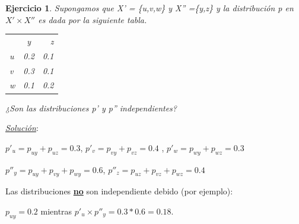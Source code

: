 \documentclass{beamer}
\theoremstyle{plain}
\theoremstyle{example}
\newtheorem{ejercicio} [Ejercicio]{Ejercicio}
\theoremstyle{example}
\begin{document}
\begin{frame}  \footnotesize

\begin{ejercicio}

Supongamos que X' = \{u,v,w\} y X'' =\{y,z\} y la distribución p en $X' \times X''$ es dada por la siguiente tabla. 

\begin{center}
 \begin{tabular}{ l c r }
         & y & z \\
   u & 0.2 & 0.1 \\
   v & 0.3 & 0.1 \\
   w & 0.1 & 0.2 \\
 \end{tabular}
\end{center}

 ¿Son las distribuciones p' y p'' independientes?\\
\end{ejercicio}
\pause
\textit{\underline{Solución}}:\\
\begin{center} $p'_u = p_{uy} + p_{uz} =0.3$,  $p'_v = p_{vy} + p_{vz} =0.4$ ,  $p'_w = p_{wy} + p_{wz} =0.3$\end{center}

\begin{center}$p''_y =p_{uy} + p_{vy}	+ p_{wy} =0.6$,  $p''_z =p_{uz} + p_{vz}	+ p_{wz} =0.4$\end{center}

Las distribuciones \underline{\textbf{no}} son independiente debido (por ejemplo):
\begin{center}$p_{uy}	= 0.2$ mientras	$p'_u \times p''_y = 0.3 * 0.6= 0.18$.\end{center}


\end{frame} 
\end{document}
